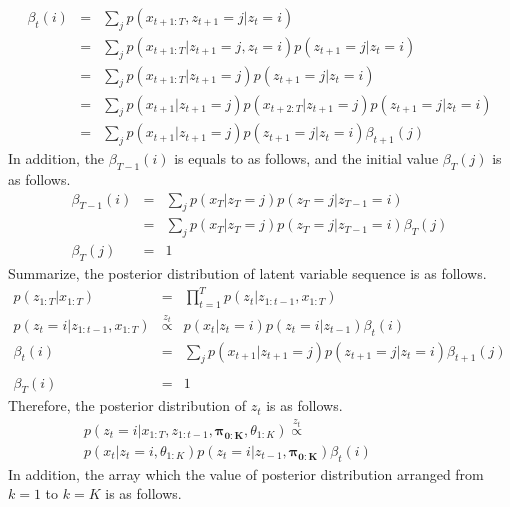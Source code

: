 \documentclass[a4paper]{article}
\newcommand{\proptoas}[1]{\overset{#1}{\propto}}
\begin{document}
\begin{eqnarray}
	\beta_t(i)
	&=&
	\sum_{j}{p(x_{t+1:T}, z_{t+1} = j | z_t = i)} \\
	&=&
	\sum_{j}{p(x_{t+1:T} | z_{t+1} = j, z_t = i) p(z_{t+1} = j | z_t = i)} \\
	&=&
	\sum_{j}{p(x_{t+1:T} | z_{t+1} = j) p(z_{t+1} = j | z_t = i)} \\
	&=&
	\sum_{j}{p(x_{t+1} | z_{t+1} = j) p(x_{t+2:T} | z_{t+1} = j) p(z_{t+1} = j | z_t = i)} \\
	&=&
	\sum_{j}{p(x_{t+1} | z_{t+1} = j) p(z_{t+1} = j | z_t = i) \beta_{t+1}(j)}
\end{eqnarray}
In addition, the $\beta_{T-1}(i)$ is equals to as follows, and the initial value $\beta_T(j)$ is as follows.
\begin{eqnarray}
	\beta_{T-1}(i)
	&=&
	\sum_{j}{p(x_{T} | z_{T} = j) p(z_{T} = j | z_{T-1} = i)}\\
	&=&
	\sum_{j}{p(x_{T} | z_{T} = j) p(z_{T} = j | z_{T-1} = i) \beta_T(j)} \\
	\beta_T(j) &=& 1
\end{eqnarray}
Summarize, the posterior distribution of latent variable sequence is as follows.
\begin{eqnarray}
	p(z_{1:T} | x_{1:T})
	&=&
	\prod_{t=1}^{T}{p(z_{t} | z_{1:t-1}, x_{1:T})} \\
	p(z_{t} = i | z_{1:t-1}, x_{1:T})
	&\proptoas{z_t}&
	p(x_t | z_t = i) p(z_t = i | z_{t-1}) \beta_t(i) \\
	\beta_t(i)
	&=&
	\sum_{j}{p(x_{t+1} | z_{t+1} = j) p(z_{t+1} = j | z_t = i) \beta_{t+1}(j)} \nonumber \\
	\\
	\beta_T(i) &=& 1
\end{eqnarray}
Therefore, the posterior distribution of $z_t$ is as follows.
\begin{eqnarray}
	p(z_t = i | x_{1:T}, z_{1:t-1}, \boldsymbol{\pi_{0:K}}, \theta_{1:K})
	\proptoas{z_t} ~~~~~~~~~~~~~~~~~~~~~~~~~~~~~~~~~~~~~~~~~~ \nonumber \\
	p(x_t | z_t = i, \theta_{1:K}) p(z_t = i | z_{t-1}, \boldsymbol{\pi_{0:K}}) \beta_t(i)
\end{eqnarray}
In addition, the array which the value of posterior distribution arranged from $k=1$ to $k=K$ is as follows.
\end{document}

